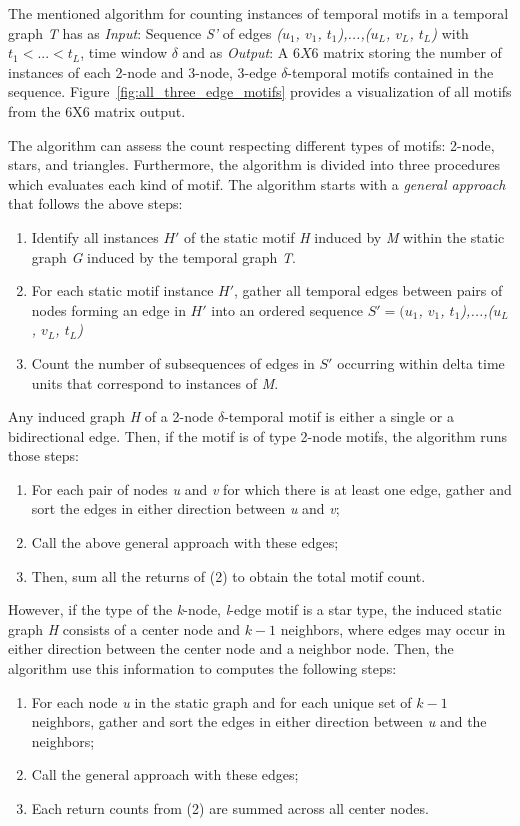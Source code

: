 \documentclass[../../thesis.tex]{subfiles}
\begin{document}
The mentioned algorithm for counting instances of temporal motifs in a temporal graph \textit{T} has as \textit{Input}: Sequence \textit{S'} of edges \textit{($u_{1}$, $v_{1}$, $t_{1}$),...,($u_{L}$, $v_{L}$, $t_{L}$)} with \textit{$t_{1}<...<t_{L}$}, time window  $\delta$ and as \textit{Output}: A $6X6$ matrix storing the number of instances of each 2-node and 3-node, 3-edge $\delta$-temporal motifs contained in the sequence. Figure~\ref{fig:all_three_edge_motifs} provides a visualization of all motifs from the 6X6 matrix output.

The algorithm can assess the count respecting different types of motifs: 2-node, stars, and triangles. Furthermore, the algorithm is divided into three procedures which evaluates each kind of motif. The algorithm starts with a \textit{general approach} that follows the above steps:
\begin{enumerate}
  \item{Identify all instances \textit{$H'$} of the static motif \textit{H} induced by \textit{M} within the static graph \textit{G} induced by the temporal graph \textit{T}.}
  \item{For each static motif instance \textit{$H'$}, gather all temporal edges between pairs of nodes forming an edge in \textit{$H'$} into an ordered sequence \textit{$S'=(u_{1}$, $v_{1}$, $t_{1}$),...,($u_{L}$, $v_{L}$, $t_{L}$)}}  
  \item{Count the number of subsequences of edges in \textit{$S'$} occurring within delta time units that correspond to instances of \textit{M}. }
\end{enumerate}


Any induced graph \textit{H} of a 2-node  $\delta$-temporal motif is either a single or a bidirectional edge. Then, if the motif is of type 2-node motifs, the algorithm runs those steps:
\begin{enumerate}
  \item{For each pair of nodes \textit{u} and \textit{v} for which there is at least one edge, gather and sort the edges in either direction between \textit{u} and \textit{v};}
  \item{Call the above general approach with these edges;}
  \item{Then, sum all the returns of (2) to obtain the total motif count.}
\end{enumerate}

However, if the type of the \textit{k}-node, \textit{l}-edge motif is a star type, the induced static graph \textit{H} consists of a center node and $k-1$ neighbors, where edges may occur in either direction between the center node and a neighbor node. Then, the algorithm use this information to computes the following steps:
\begin{enumerate}
  \item{For each node \textit{u} in the static graph and for each unique set of $k-1$ neighbors, gather and sort the edges in either direction between \textit{u} and the neighbors;}
  \item{Call the general approach with these edges;}
  \item{Each return counts from (2) are summed across all center nodes.}
\end{enumerate}
\end{document}
